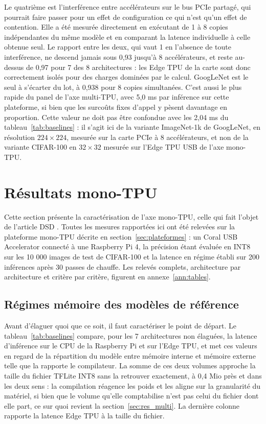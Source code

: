 \documentclass[11pt,a4paper]{report}
\begin{document}
Le quatrième est l'interférence entre accélérateurs sur le bus PCIe partagé, qui pourrait faire passer pour un effet de configuration ce qui n'est qu'un effet de contention. Elle a été mesurée directement en exécutant de 1 à 8 copies indépendantes du même modèle et en comparant la latence individuelle à celle obtenue seul. Le rapport entre les deux, qui vaut 1 en l'absence de toute interférence, ne descend jamais sous 0,93 jusqu'à 8 accélérateurs, et reste au-dessus de 0,97 pour 7 des 8 architectures : les Edge TPU de la carte sont donc correctement isolés pour des charges dominées par le calcul. GoogLeNet est le seul à s'écarter du lot, à 0,938 pour 8 copies simultanées. C'est aussi le plus rapide du panel de l'axe multi-TPU, avec 5,0 ms par inférence sur cette plateforme, si bien que les surcoûts fixes d'appel y pèsent davantage en proportion. Cette valeur ne doit pas être confondue avec les 2,04 ms du tableau~\ref{tab:baselines} : il s'agit ici de la variante ImageNet-1k de GoogLeNet, en résolution $224 \times 224$, mesurée sur la carte PCIe à 8 accélérateurs, et non de la variante CIFAR-100 en $32 \times 32$ mesurée sur l'Edge TPU USB de l'axe mono-TPU.

\section{Résultats mono-TPU}
\label{sec:res_mono}

Cette section présente la caractérisation de l'axe mono-TPU, celle qui fait l'objet de l'article DSD \cite{zouhdiPruningDeepNeural2026}. Toutes les mesures rapportées ici ont été relevées sur la plateforme mono-TPU décrite en section~\ref{sec:plateformes} : un Coral USB Accelerator connecté à une Raspberry Pi 4, la précision étant évaluée en INT8 sur les 10 000 images de test de CIFAR-100 et la latence en régime établi sur 200 inférences après 30 passes de chauffe. Les relevés complets, architecture par architecture et critère par critère, figurent en annexe~\ref{ann:tables}.

\subsection{Régimes mémoire des modèles de référence}

Avant d'élaguer quoi que ce soit, il faut caractériser le point de départ. Le tableau~\ref{tab:baselines} compare, pour les 7 architectures non élaguées, la latence d'inférence sur le CPU de la Raspberry Pi et sur l'Edge TPU, et met ces valeurs en regard de la répartition du modèle entre mémoire interne et mémoire externe telle que la rapporte le compilateur. La somme de ces deux volumes approche la taille du fichier TFLite INT8 sans la retrouver exactement, à 0,4 Mio près et dans les deux sens : la compilation réagence les poids et les aligne sur la granularité du matériel, si bien que le volume qu'elle comptabilise n'est pas celui du fichier dont elle part, ce sur quoi revient la section~\ref{sec:res_multi}. La dernière colonne rapporte la latence Edge TPU à la taille du fichier.
\end{document}

